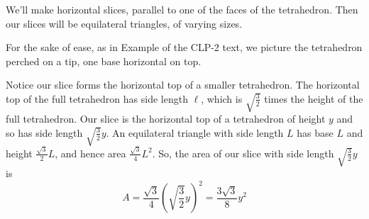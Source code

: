 \begin{solution}
We'll make horizontal slices, parallel to one of the faces of the tetrahedron. Then our slices will be equilateral triangles, of varying sizes.

\begin{center}
\end{center}



 For the sake of ease, as in Example  of the CLP-2 text,
we picture the tetrahedron perched on a tip, one base horizontal on top.

\begin{center}
\end{center}

Notice our slice forms the horizontal top of a smaller tetrahedron. The horizontal top of the full tetrahedron has side length $\ell$, which is
             $\sqrt{\frac{3}{2}}$ times the height of the full tetrahedron. Our slice
             is the horizontal top of a tetrahedron of height $y$ and so has side length  $\sqrt{\frac{3}{2}}y$. An equilateral triangle with side length $L$ has base $L$ and height
              $\frac{\sqrt{3}}{2}L$, and hence area $\frac{\sqrt{3}}{4}L^2$.
             So, the area of our slice with side length $\sqrt{\frac{3}{2}}y$ is
\[A = \frac{\sqrt{3}}{4}\left(\sqrt{\frac{3}{2}}y\right)^2 = \frac{3\sqrt{3}}{8}y^2\]


\end{solution}
